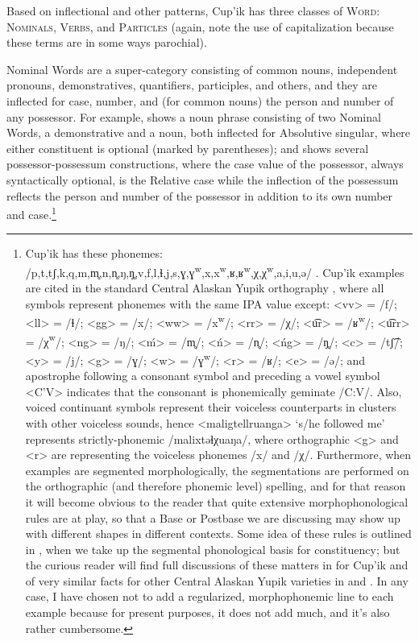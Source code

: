 \documentclass[output=paper]{langscibook}
\begin{document}
Based on inflectional and other patterns, Cup'ik has three classes of \textsc{Word}: \textsc{Nominals}, \textsc{Verbs}, and \textsc{Particles} (again, note the use of capitalization because these terms are in some ways parochial).

Nominal Words are a super-category consisting of common nouns, independent pronouns, demonstratives, quantifiers, participles, and others, and they are inflected for case, number, and (for common nouns) the person and number of any possessor. For example,  shows a noun phrase consisting of two Nominal Words, a demonstrative and a noun, both inflected for Absolutive singular, where either constituent is optional (marked by parentheses); and  shows several possessor-possessum constructions, where the case value of the possessor, always syntactically optional, is the Relative case while the inflection of the possessum reflects the person and number of the possessor in addition to its own number and case.\footnote{Cup'ik has these phonemes: \textrm{/p,t,tʃ,k,q,m,m̥,n,n̥,ŋ,ŋ̥,v,f,l,ɬ,j,s,ɣ,ɣ}\textrm{\textsuperscript{w}}\textrm{,x,x}\textrm{\textsuperscript{w}}\textrm{,ʁ,ʁ}\textrm{\textsuperscript{w}}\textrm{,χ,χ}\textrm{\textsuperscript{w}}\textrm{,a,i,u,ǝ/} \citep{Woodbury1981}. Cup'ik examples are cited in the standard Central Alaskan Yupik orthography \citep{Jacobson2012}, where all symbols represent phonemes with the same IPA value except\textrm{: <vv> = /f/; <ll> = /ɬ/; <gg> = /x/; <ww> = /x}\textrm{\textsuperscript{w}}\textrm{/; <rr> = /χ/; <u͡r> = /ʁ}\textrm{\textsuperscript{w}}\textrm{/; <u͡rr> = /χ}\textrm{\textsuperscript{w}}\textrm{/; <ng> = /ŋ/; <ḿ> = /m̥/; <ń> = /n̥/; <ńg> = /ŋ̥/; <c> = /tʃ͡/; <y> = /j/; <g> = /ɣ/; <w> = /ɣ}\textrm{\textsuperscript{w}}\textrm{/; <r> = /ʁ/; <e> = /ǝ/;} and apostrophe following a consonant symbol and preceding a vowel symbol <C'V> indicates that the consonant is phonemically geminate /C:V/. Also, voiced continuant symbols represent their voiceless counterparts in clusters with other voiceless sounds, hence <maligtellruanga> `s/he followed me' represents strictly-phonemic /malixtǝɬχuaŋa/, where orthographic <g> and <r> are representing the voiceless phonemes /x/ and /χ/. Furthermore, when examples are segmented morphologically, the segmentations are performed on the orthographic (and therefore phonemic level) spelling, and for that reason it will become obvious to the reader that quite extensive morphophonological rules are at play, so that a Base or Postbase we are discussing may show up with different shapes in different contexts. Some idea of these rules is outlined in , when we take up the segmental phonological basis for constituency; but the curious reader will find full discussions of these matters in \citet{Woodbury1981} for Cup'ik and of very similar facts for other Central Alaskan Yupik varieties in \citet{Miyaoka2012} and \citet{Jacobson2012}. In any case, I have chosen not to add a regularized, morphophonemic line to each example because for present purposes, it does not add much, and it's also rather cumbersome.}
\end{document}
